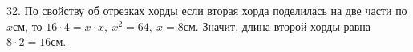 32. По свойству об отрезках хорды если вторая хорда поделилась на две части по $x$см, то $16\cdot4=x\cdot x,\ x^2=64,\ x=8$см. Значит, длина второй хорды равна $8\cdot2=16$см.\\
